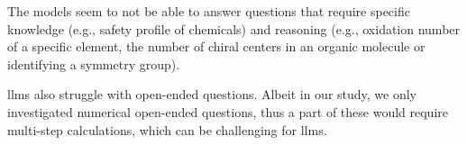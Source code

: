 The models seem to not be able to answer questions that require specific knowledge (e.g., safety profile of chemicals) and reasoning (e.g., oxidation number of a specific element, the number of chiral centers in an organic molecule or identifying a symmetry group).

\glspl{llm} also struggle with open-ended questions.
Albeit in our study, we only investigated numerical open-ended questions, thus a part of these would require multi-step calculations, which can be challenging for \glspl{llm}.\autocite{zhou2023llm_arithmetics}